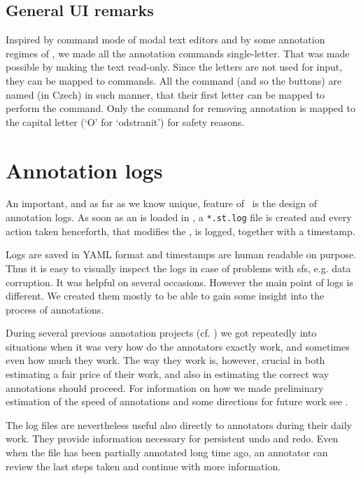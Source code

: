 \subsection{General UI remarks}
Inspired by command mode of modal text editors and by some annotation regimes of \tred, we made all the annotation commands single-letter. That was made possible by making the text read-only. Since the letters are not used for input, they can be mapped to commands. All the command (and so the buttons) are named (in Czech) in such manner, that their first letter can be mapped to perform the command. Only the command for removing annotation is mapped to the capital letter (`O' for `odstranit') for safety reasons.


\section{Annotation logs}
\label{sec:logs}
An important, and as far as we know unique, feature of \seman\ is the design of annotation logs. As soon as an \sf is loaded in \seman, a \verb=*.st.log= file is created and every action taken henceforth, that modifies the \sf, is logged, together with a timestamp. 

Logs are saved in YAML format and timestamps are human readable on purpose. Thus it is easy to visually inspect the logs in case of problems with sf{}s, e.g. data corruption. It was helpful on several occasions. However the main point of logs is different. We created them mostly to be able to gain some insight into the process of annotations. 

During several previous annotation projects (cf. \citealp{hajic-cwn:04,bejcek:2006}) we got repeatedly into situations when it was very how do the annotators exactly work, and sometimes even how much they work. The way they work is, however, crucial in both estimating a fair price of their work, and also in estimating the correct way annotations should proceed. For information on how we made preliminary estimation of the speed of annotations and some directions for future work see .

The log files are nevertheless useful also directly to annotators during their daily work. They provide information necessary for persistent undo and redo. Even when the file has been partially annotated long time ago, an annotator can review the last steps taken and continue with more information.
